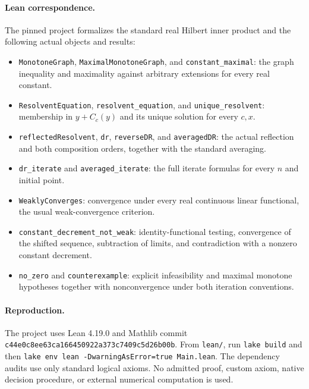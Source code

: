 \documentclass[11pt]{article}
\begin{document}
\paragraph{Lean correspondence.}
The pinned project formalizes the standard real Hilbert inner product and the following actual objects and results:
\begin{itemize}
\item \texttt{MonotoneGraph}, \texttt{MaximalMonotoneGraph}, and \texttt{constant\_maximal}: the graph inequality and maximality against arbitrary extensions for every real constant.
\item \texttt{ResolventEquation}, \texttt{resolvent\_equation}, and \texttt{unique\_resolvent}: membership in $y+C_c(y)$ and its unique solution for every $c,x$.
\item \texttt{reflectedResolvent}, \texttt{dr}, \texttt{reverseDR}, and \texttt{averagedDR}: the actual reflection and both composition orders, together with the standard averaging.
\item \texttt{dr\_iterate} and \texttt{averaged\_iterate}: the full iterate formulas for every $n$ and initial point.
\item \texttt{WeaklyConverges}: convergence under every real continuous linear functional, the usual weak-convergence criterion.
\item \texttt{constant\_decrement\_not\_weak}: identity-functional testing, convergence of the shifted sequence, subtraction of limits, and contradiction with a nonzero constant decrement.
\item \texttt{no\_zero} and \texttt{counterexample}: explicit infeasibility and maximal monotone hypotheses together with nonconvergence under both iteration conventions.
\end{itemize}

\paragraph{Reproduction.}
The project uses Lean 4.19.0 and Mathlib commit
\texttt{c44e0c8ee63ca166450922a373c7409c5d26b00b}.
From \texttt{lean/}, run \texttt{lake build} and then
\texttt{lake env lean -DwarningAsError=true Main.lean}.
The dependency audits use only standard logical axioms. No admitted proof, custom axiom, native decision procedure, or external numerical computation is used.
\end{document}
